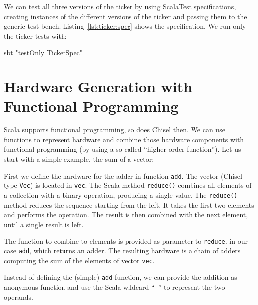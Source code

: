\documentclass[%
    10pt,
    headinclude, footexclude,
    openright, %
    notitlepage,
    cleardoubleempty,
    headsepline,
    pointlessnumbers,
    bibtotoc, idxtotoc,
    ]{scrbook}
\newcommand{\code}[1]{{\small{\texttt{#1}}}}
\begin{document}


We can test all three versions of the ticker by using ScalaTest specifications,
creating instances of the different versions of the ticker and passing them
to the generic test bench. Listing~\ref{lst:ticker:spec} shows the specification.
We run only the ticker tests with:
\begin{chisel}
sbt "testOnly TickerSpec"
\end{chisel}


\section{Hardware Generation with Functional Programming}
\label{sec:functional}


Scala supports functional programming, so does Chisel then.
We can use functions to represent hardware and combine those hardware components
with functional programming (by using a so-called ``higher-order function'').
Let us start with a simple example, the sum of a vector:


\noindent First we define the hardware for the adder in function \code{add}.
The vector (Chisel type \code{Vec}) is located in \code{vec}. The Scala method \code{reduce()} combines
all elements of a collection with a binary operation, producing a single value.
The \code{reduce()} method reduces the sequence starting from the left.
It takes the first two elements and performs the operation. The result is then combined
with the next element, until a single result is left.

The function to combine to elements is provided as parameter to \code{reduce}, in our case \code{add},
which returns an adder. The resulting hardware is a chain of adders computing
the sum of the elements of vector \code{vec}.

Instead of defining the (simple) \code{add} function, we can provide the addition
as anonymous function and use the Scala wildcard ``\code{\_}'' to represent the
two operands.

\end{document}
